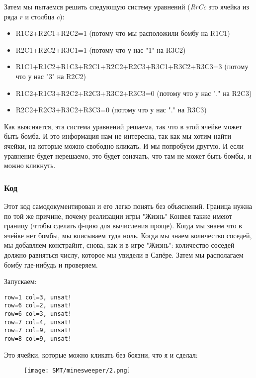 Затем мы пытаемся решить следующую систему уравнений (\textit{RrCc} это ячейка из ряда $r$ и столбца $c$):

\begin{itemize}
\item R1C2+R2C1+R2C2=1                               (потому что мы расположили бомбу на R1C1)	
\item R2C1+R2C2+R3C1=1                               (потому что у нас "1" на R3C2)	
\item R1C1+R1C2+R1C3+R2C1+R2C2+R2C3+R3C1+R3C2+R3C3=3 (потому что у нас "3" на R2C2)	
\item R1C2+R1C3+R2C2+R2C3+R3C2+R3C3=0                (потому что у нас "." на R2C3)	
\item R2C2+R2C3+R3C2+R3C3=0                          (потому что у нас "." на R3C3)
\end{itemize}

Как выясняется, эта система уравнений решаема, так что в этой ячейке может быть бомба.
И это информация нам не интересна, так как мы хотим найти ячейки, на которые можно свободно кликать.
И мы попробуем другую.
И если уравнение будет нерешаемо, это будет означать, что там не может быть бомбы, и можно кликнуть.

\subsubsection{Код}



Этот код самодокументирован и его легко понять без объяснений.
Граница нужна по той же причине, почему реализации игры "Жизнь" Конвея также имеют границу (чтобы сделать
ф-цию для вычисления проще).
Когда мы знаем что в ячейке нет бомбы, мы вписываем туда ноль.
Когда мы знаем количество соседей, мы добавляем констрайнт, снова, как и в игре "Жизнь": количество соседей
должно равняться числу, которое мы увидели в Сапёре.
Затем мы располагаем бомбу где-нибудь и проверяем.

Запускаем:

\begin{lstlisting}
row=1 col=3, unsat!
row=6 col=2, unsat!
row=6 col=3, unsat!
row=7 col=4, unsat!
row=7 col=9, unsat!
row=8 col=9, unsat!
\end{lstlisting}

Это ячейки, которые можно кликать без боязни, что я и сделал:

\begin{figure}[H]
\centering
\texttt{[image: SMT/minesweeper/2.png]}
\end{figure}

